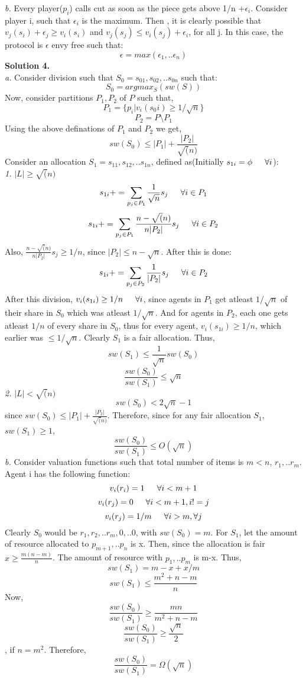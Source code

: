 \documentclass{article}
\newcommand\tab[1][15pt]{\hspace*{#1}}
\begin{document}
\emph{b. } Every player($p_i$) calls cut as soon as the piece gets above 1/n $+\epsilon_i$. Consider player i, such that $\epsilon_i$ is the maximum. Then , it is clearly possible that $v_j(s_i)+\epsilon_j \geq v_i(s_i)$ and $v_j(s_j) \leq v_i(s_j) + \epsilon_i$, for all j. In this case, the protocol is $\epsilon$ envy free such that:
$$\epsilon = max(\epsilon_1,..\epsilon_n)$$
\newline
\textbf{Solution 4.} \\
\emph{a. } Consider division such that $S_0= {s_{01}, s_{02},..s_{0n}}$ such that:
$$S_0 = argmax_{S}(sw(S))$$
Now, consider partitions $P_1, P_2$ of $P$ such that, 
$$P_1 = \{p_i | v_i(s_0i) \geq 1/\sqrt{n} \}$$
$$P_2 = P \setminus P_1$$
Using the above definations of $P_1$ and $P_2$ we get,
$$sw(S_0) \leq |P_1| + \frac{|P_2|}{\sqrt(n)}$$
Consider an allocation $S_1 = {s_{11},s_{12},..s_{1n}}$, defined as(Initially $s_{1i} = \phi \tab \forall i$): \\
\emph{1. } \emph{$|L| \geq \sqrt(n)$} \\
$$s_{1i} += \sum_{p_j \in P_1} \frac{1}{\sqrt{n}}s_j \tab \forall i \in P_1$$
$$s_{1i} += \sum_{p_j \in P_1} \frac{n-\sqrt(n)}{n|P_2|}s_j \tab \forall i \in P_2$$
Also, $\frac{n-\sqrt(n)}{n|P_2|}s_j \geq 1/n$, since $|P_2| \leq n-\sqrt{n}$. After this is done:
$$s_{1i} += \sum_{p_j \in P_2} \frac{1}{|P_2|}s_j \tab \forall i \in P_2$$
After this division, $v_i(s_{1i}) \geq 1/n \tab \forall i$, since agents in $P_1$ get atleast $1/\sqrt{n}$ of their share in $S_0$ which was atleast $1/\sqrt{n}$. And for agents in $P_2$, each one gets atleast $1/n$ of every share in $S_0$, thus for every agent, $v_i(s_{1i}) \geq 1/n $, which earlier was $ \leq 1/\sqrt{n}$. Clearly $S_1$ is a fair allocation. Thus, 
$$sw(S_1) \leq \frac{1}{\sqrt{n}}sw(S_0)$$
$$\frac{sw(S_0)}{sw(S_1)} \leq \sqrt{n}$$
\emph{2. } \emph{$|L| < \sqrt(n)$} \\
$$sw(S_0) < 2\sqrt{n}-1$$
since $sw(S_0) \leq |P_1| + \frac{|P_2|}{\sqrt(n)}$. Therefore, since for any fair allocation $S_1$, $sw(S_1) \geq 1$, 
$$\frac{sw(S_0)}{sw(S_1)} \leq O(\sqrt{n})$$
\emph{b. } Consider valuation functions such that total number of items is $m<n$, $r_1,.. r_m$. Agent i has the following function:
$$v_i(r_i) = 1 \tab \forall i< m+1$$
$$v_i(r_j) = 0 \tab \forall i< m+1, i != j$$
$$v_i(r_j) = 1/m \tab \forall i >m, \forall j$$
Clearly $S_0$ would be $r_1, r_2,..r_m, 0,..0$, with $sw(S_0)=m$. For $S_1$, let the amount of resource allocated to $p_{m+1},..p_n$ is x. Then, since the allocation is fair $x\geq \frac{m(n-m)}{n}$. The amount of resource with $p_1,..p_m$ is m-x. Thus, 
$$sw(S_1) = m-x + x/m$$
$$sw(S_1) \leq \frac{m^2+n-m}{n}$$
Now, 
$$\frac{sw(S_0)}{sw(S_1)}  \geq \frac{mn}{m^2+n-m}$$
$$\frac{sw(S_0)}{sw(S_1)}  \geq \frac{\sqrt{n}}{2}$$, if $n=m^2$.
Therefore, 
$$\frac{sw(S_0)}{sw(S_1)}  = \Omega(\sqrt{n})$$ 
\end{document}

